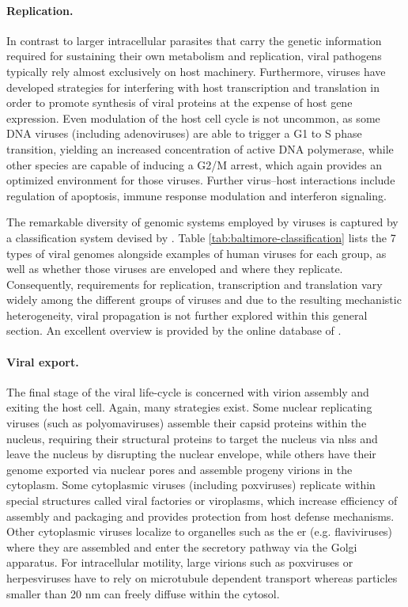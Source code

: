 \paragraph{Replication.}
In contrast to larger intracellular parasites that carry the genetic information required for sustaining their own metabolism and replication, viral pathogens typically rely almost exclusively on host machinery. Furthermore, viruses have developed strategies for interfering with host transcription and translation in order to promote synthesis of viral proteins at the expense of host gene expression. Even modulation of the host cell cycle is not uncommon, as some DNA viruses (including adenoviruses) are able to trigger a G1 to S phase transition, yielding an increased concentration of active DNA polymerase, while other species are capable of inducing a G2/M arrest, which again provides an optimized environment for those viruses. Further virus--host interactions include regulation of apoptosis, immune response modulation and interferon signaling.

The remarkable diversity of genomic systems employed by viruses is captured by a classification system devised by \cite{Baltimore1971}. Table \ref{tab:baltimore-classification} lists the 7 types of viral genomes alongside examples of human viruses for each group, as well as whether those viruses are enveloped and where they replicate. Consequently, requirements for replication, transcription and translation vary widely among the different groups of viruses and due to the resulting mechanistic heterogeneity, viral propagation is not further explored within this general section. An excellent overview is provided by the online database of \citeauthor{Hulo2011}.

\paragraph{Viral export.}
The final stage of the viral life-cycle is concerned with virion assembly and exiting the host cell. Again, many strategies exist. Some nuclear replicating viruses (such as polyomaviruses) assemble their capsid proteins within the nucleus, requiring their structural proteins to target the nucleus via \glspl{nls} and leave the nucleus by disrupting the nuclear envelope, while others have their genome exported via nuclear pores and assemble progeny virions in the cytoplasm. Some cytoplasmic viruses (including poxviruses) replicate within special structures called viral factories or viroplasms, which increase efficiency of assembly and packaging and provides protection from host defense mechanisms. Other cytoplasmic viruses localize to organelles such as the \gls{er} (e.g. flaviviruses) where they are assembled and enter the secretory pathway via the Golgi apparatus. For intracellular motility, large virions such as poxviruses or herpesviruses have to rely on microtubule dependent transport whereas particles smaller than 20 nm can freely diffuse within the cytosol.

